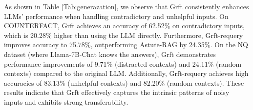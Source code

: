 As shown in Table \ref{Tab:generazation}, we observe that Grft consistently enhances LLMs' performance when handling contradictory and unhelpful inputs. On COUNTERFACT, Grft achieves an accuracy of 62.52\% on contradictory inputs, which is 20.28\% higher than using the LLM directly. Furthermore, Grft-requery improves accuracy to 75.78\%, outperforming Astute-RAG by 24.35\%. On the NQ dataset (where Llama-7B-Chat knows the answers), Grft demonstrates performance improvements of 9.71\% (distracted contexts) and 24.11\% (random contexts) compared to the original LLM. Additionally, Grft-requery achieves high accuracies of 83.13\% (unhelpful contexts) and 82.20\% (random contexts).  These results indicate that Grft effectively captures the intrinsic patterns of noisy inputs and exhibits strong transferability.









